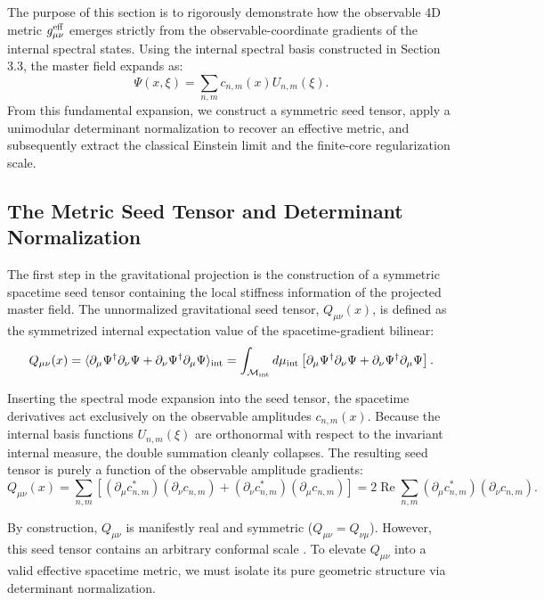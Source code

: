 \documentclass[11pt]{article}
\begin{document}
The purpose of this section is to rigorously demonstrate how the observable 4D metric $g_{\mu\nu}^{\rm eff}$ emerges strictly from the observable-coordinate gradients of the internal spectral states. Using the internal spectral basis constructed in Section 3.3, the master field expands as:
\begin{equation}
\Psi(x, \xi) = \sum_{n,m} c_{n,m}(x)U_{n,m}(\xi).
\end{equation}
From this fundamental expansion, we construct a symmetric seed tensor, apply a unimodular determinant normalization to recover an effective metric, and subsequently extract the classical Einstein limit and the finite-core regularization scale.

\subsection{The Metric Seed Tensor and Determinant Normalization}
\label{sec:metric_seed_and_normalization}

The first step in the gravitational projection is the construction of a symmetric spacetime seed tensor containing the local stiffness information of the projected master field. The unnormalized gravitational seed tensor, $Q_{\mu\nu}(x)$, is defined as the symmetrized internal expectation value of the spacetime-gradient bilinear:
\begin{equation}
Q_{\mu\nu}(x) = \langle \partial_\mu \Psi^\dagger \partial_\nu \Psi + \partial_\nu \Psi^\dagger \partial_\mu \Psi \rangle_{\rm int} = \int_{\mathcal{M}_{\rm int}} d\mu_{\rm int} \left[ \partial_\mu \Psi^\dagger \partial_\nu \Psi + \partial_\nu \Psi^\dagger \partial_\mu \Psi \right].
\end{equation}

Inserting the spectral mode expansion into the seed tensor, the spacetime derivatives act exclusively on the observable amplitudes $c_{n,m}(x)$. Because the internal basis functions $U_{n,m}(\xi)$ are orthonormal with respect to the invariant internal measure, the double summation cleanly collapses. The resulting seed tensor is purely a function of the observable amplitude gradients:
\begin{equation}
Q_{\mu\nu}(x) = \sum_{n,m} \left[ (\partial_\mu c^*_{n,m})(\partial_\nu c_{n,m}) + (\partial_\nu c^*_{n,m})(\partial_\mu c_{n,m}) \right] = 2 \operatorname{Re} \sum_{n,m} (\partial_\mu c^*_{n,m})(\partial_\nu c_{n,m}).
\end{equation}

By construction, $Q_{\mu\nu}$ is manifestly real and symmetric ($Q_{\mu\nu} = Q_{\nu\mu}$). However, this seed tensor contains an arbitrary conformal scale \cite{Sakharov1967}. To elevate $Q_{\mu\nu}$ into a valid effective spacetime metric, we must isolate its pure geometric structure via determinant normalization. 
\end{document}
